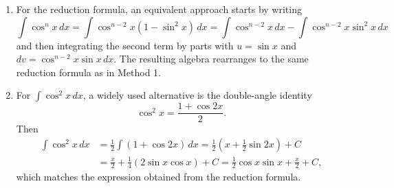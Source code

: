 \documentclass[12pt]{article}
\begin{document}
\begin{enumerate}[label=(\alph*)]
\item For the reduction formula, an equivalent approach starts by writing
\[
\int \cos^{n}x\,dx
= \int \cos^{n-2}x(1-\sin^{2}x)\,dx
= \int \cos^{n-2}x\,dx - \int \cos^{n-2}x\sin^{2}x\,dx
\]
and then integrating the second term by parts with \(u=\sin x\) and \(dv=\cos^{n-2}x\sin x\,dx\). The resulting algebra rearranges to the same reduction formula as in Method 1.

\item For \(\int \cos^{2}x\,dx\), a widely used alternative is the double-angle identity
\[
\cos^{2}x = \frac{1+\cos 2x}{2}.
\]
Then
\begin{align*}
\int \cos^{2}x\,dx
&= \frac{1}{2}\int (1+\cos 2x)\,dx
= \frac{1}{2}\left(x+\frac{1}{2}\sin 2x\right)+C\\
&= \frac{x}{2}+\frac{1}{4}(2\sin x\cos x)+C
= \frac{1}{2}\cos x\sin x + \frac{x}{2} + C,
\end{align*}
which matches the expression obtained from the reduction formula.
\end{enumerate}
\end{document}
